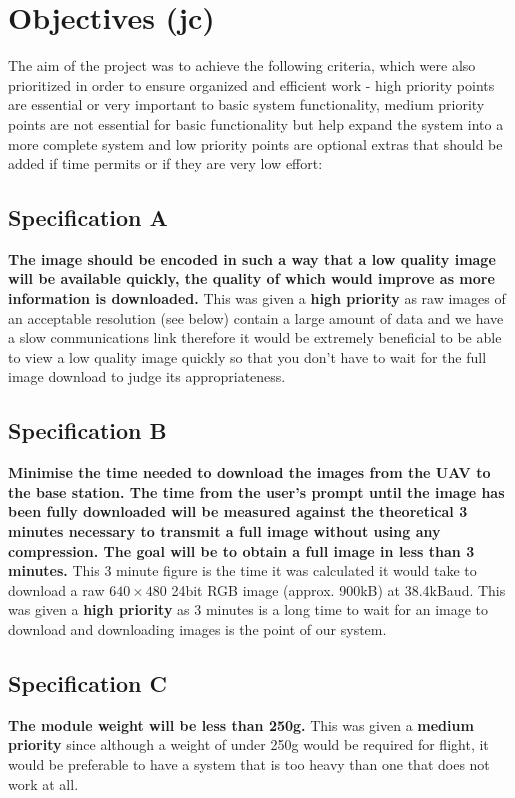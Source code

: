 \section{Objectives (jc)} 

The aim of the project was to achieve the following criteria, which were also prioritized in order to ensure organized and efficient work - high priority points are essential or very important to basic system functionality, medium priority points are not essential for basic functionality but help expand the system into a more complete system and low priority points are optional extras that should be added if time permits or if they are very low effort:

	\subsection{Specification A}\label{sec:spec_a} \textbf{The image should be encoded in such a way that a low quality image will be available quickly, the quality of which would improve as more information is downloaded.} This was given a \textbf{high priority} as raw images of an acceptable resolution (see below) contain a large amount of data and we have a slow communications link therefore it would be extremely beneficial to be able to view a low quality image quickly so that you don't have to wait for the full image download to judge its appropriateness.
	\subsection{Specification B}\label{sec:spec_b} \textbf{Minimise the time needed to download the images from the UAV to the base station. The time from the user’s prompt until the image has been fully downloaded will be measured against the theoretical 3 minutes necessary to transmit a full image without using any compression. The goal will be to obtain a full image in \textbf{less than 3 minutes.}} 
This 3 minute figure is the time it was calculated it would take to download a raw $640\times480$ 24bit RGB image (approx. 900kB) at 38.4kBaud. This was given a \textbf{high priority} as 3 minutes is a long time to wait for an image to download and downloading images is the point of our system.
	\subsection{Specification C}\label{sec:spec_c} \textbf{The module weight will be \textbf{less than 250g}.} 
This was given a \textbf{medium priority} since although a weight of under 250g would be required for flight, it would be preferable to have a system that is too heavy than one that does not work at all.%
